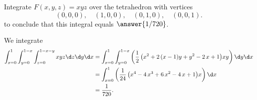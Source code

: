 \documentclass{ximera}
\author{Jim Fowler}
\begin{document}
\begin{exercise}
Integrate $F(x,y,z) = xyz$ over the tetrahedron with vertices
$$
(0,0,0), \hspace{1em}
(1,0,0), \hspace{1em}
(0,1,0), \hspace{1em}
(0,0,1).
$$
to conclude that this integral equals $\answer{1/720}$.

\begin{hint}
We integrate
\begin{align*}
  \int_{x=0}^1   \int_{y=0}^{1-x}  \int_{z=0}^{1-x-y} xyz \d z \d y \d x
&= \int_{x=0}^1   \int_{y=0}^{1-x}  \left( \frac{1}{2} \, {\left(x^{2} + 2 \, {\left(x - 1\right)} y + y^{2} - 2 \, x + 1\right)} x y
 \right) \d y \d x \\
&= \int_{x=0}^1  \left( \frac{1}{24} \, {\left(x^{4} - 4 \, x^{3} + 6 \, x^{2} - 4 \, x + 1\right)} x \right) \d x \\
&= \frac{1}{720}.
\end{align*}
\end{hint}

\end{exercise}
\end{document}
